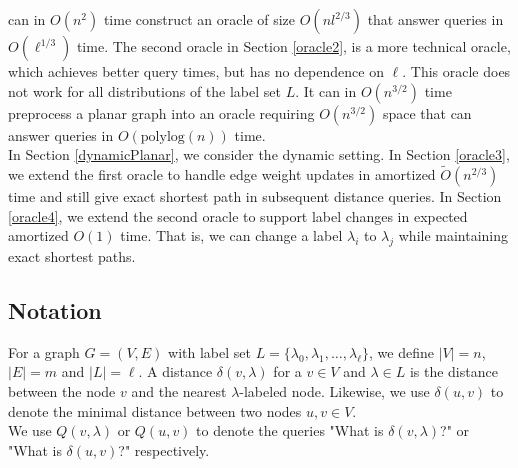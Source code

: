 can in $O(n^2)$ time construct an oracle of size $O(nl^{2/3})$ that answer queries in
$O(\ell^{1/3})$ time. The second oracle
in Section \ref{oracle2}, is a more technical oracle, which achieves better query times, but has no dependence
on $\ell$. This oracle does not work for all distributions of the label set $L$. It can
in $O(n^{3/2})$ time preprocess a planar graph into an oracle requiring $O(n^{3/2})$
space that can answer queries in $O(\text{polylog}(n))$ time. \\
In Section \ref{dynamicPlanar}, we consider the dynamic setting. In Section
\ref{oracle3}, we extend the first oracle to handle edge
weight updates in amortized $\tilde{O}(n^{2/3})$ time and still give exact shortest path in subsequent distance queries. In Section \ref{oracle4}, we extend the second oracle to support label
changes in expected amortized $O(1)$ time. That is, we can change a label $\lambda_i$ to $\lambda_j$ while maintaining
exact shortest paths.

\subsection{Notation}\label{notation}
For a graph $G=(V,E)$ with label set $L=\{\lambda_0, \lambda_1, \dots, \lambda_\ell\}$, we define $|V|=n$, $|E|=m$ and $|L|=\ell$. A
distance $\delta(v,\lambda)$ for a $v\in V$ and $\lambda\in L$ is the distance between
the node $v$ and the nearest $\lambda$-labeled node. Likewise, we use $\delta(u,v)$ to denote
the minimal distance between two nodes $u,v\in V$. \\
We use $Q(v,\lambda)$ or $Q(u,v)$ to denote the queries "What is $\delta(v,\lambda)$?" or
"What is $\delta(u,v)$?" respectively. \\
